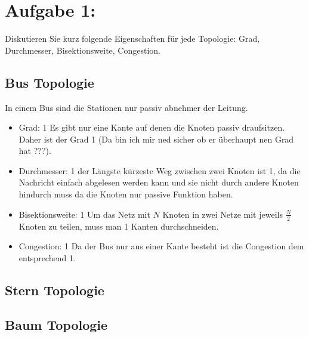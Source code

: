 \section{Aufgabe 1:}
Diskutieren Sie kurz folgende Eigenschaften für jede Topologie: Grad, Durchmesser, Bisektionsweite, Congestion.
\subsection{Bus Topologie}
In einem Bus sind die Stationen nur passiv abnehmer der Leitung.
\begin{itemize}
  \item Grad: 1
  \newline Es gibt nur eine Kante auf denen die Knoten passiv draufsitzen. Daher ist der Grad 1  (Da bin ich mir ned sicher ob er überhaupt nen Grad hat ???).
  \item Durchmesser: 1
   \newline der Längste kürzeste Weg zwischen zwei Knoten ist 1, da die Nachricht einfach abgelesen werden kann und sie nicht durch andere Knoten hindurch muss da die Knoten nur passive Funktion haben.
  \item Bisektionsweite: 1
  \newline  Um das Netz mit $N$ Knoten in zwei Netze mit jeweils $\frac{N}{2}$ Knoten zu teilen, muss man 1 Kanten durchschneiden.
  \item Congestion: 1
  \newline Da der Bus nur aus einer Kante besteht ist die Congestion dem entsprechend 1.   
\end{itemize}

\subsection{Stern Topologie}

\subsection{Baum Topologie}

